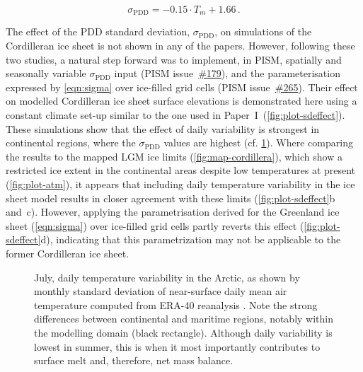 \documentclass{article}
\newcommand{\sPDD}[0]{\sigma_{\mathrm{PDD}}}
\newcommand{\CCLI}[0]{Paper~I}      %
\newcommand{\issue}[1]{\href{https://github.com/pism/pism/issues/#1}{\##1}}
\begin{document}
\begin{equation}
    \label{eqn:sigma}
    \sPDD = -0.15 \cdot T_{m} + 1.66\,.
\end{equation}

The effect of the PDD standard deviation, $\sPDD$, on simulations of the
Cordilleran ice sheet is not shown in any of the papers. However, following
these two studies, a natural step forward was to implement, in PISM, spatially
and seasonally variable $\sPDD$ input (PISM issue~\issue{179}), and the
parameterisation expressed by \cref{eqn:sigma} over ice-filled grid cells
(PISM issue~\issue{265}). Their effect on modelled Cordilleran ice sheet
surface elevations is demonstrated here using a constant climate set-up similar
to the one used in \CCLI\ (\cref{fig:plot-sdeffect}). These simulations show
that the effect of daily variability is strongest in continental regions, where
the $\sPDD$ values are highest (cf. \cref{fig:plot-sdmap}). Where comparing the
results to the mapped LGM ice limits (\cref{fig:map-cordillera}), which show
a restricted ice extent in the continental areas despite low temperatures at
present (\cref{fig:plot-atm}), it appears that including daily temperature
variability in the ice sheet model results in closer agreement with these
limits (\cref{fig:plot-sdeffect}b and~c). However, applying the parametrisation
derived for the Greenland ice sheet (\cref{eqn:sigma}) over ice-filled grid
cells partly reverts this effect (\cref{fig:plot-sdeffect}d), indicating that
this parametrization may not be applicable to the former Cordilleran ice sheet.

\begin{figure}
  \centering
  \caption{July, daily temperature variability in the Arctic, as shown by
           monthly standard deviation of near-surface daily mean air
           temperature computed from ERA-40 reanalysis
           \citep{Uppala.etal.2005}. Note the strong differences between
           continental and maritime regions, notably within the modelling domain
           (black rectangle). Although daily variability is lowest in summer,
           this is when it most importantly contributes to surface melt and,
           therefore, net mass balance.}
  \label{fig:plot-sdmap}
\end{figure}
\end{document}
